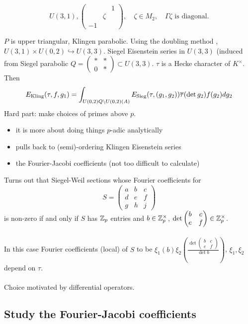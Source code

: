 \documentclass[12pt,amsfont]{amsart}
\begin{document}
\[U(3,1), \begin{pmatrix} & & 1 \\ & \zeta & \\ -1 & & \end{pmatrix}, \quad \zeta \in M_2, \quad \Gamma \zeta \text{ is diagonal.} \]

$P$ is upper triangular, Klingen parabolic. Using the doubling method , $U(3,1) \times U(0,2) \hookrightarrow U(3,3)$. Siegel Eisenstein series in $U(3,3)$ (induced from Siegel parabolic $Q = \begin{pmatrix} \ast & \ast \\ 0 & \ast \end{pmatrix} \subset U(3,3)$. $\tau$ is a Hecke character of $K^\times$. Then
\[E_{\text{Kling}}(\tau, f, g_1) = \int_{U(0,2)Q \setminus U(0,2)(A)} E_{\text{Sieg}}(\tau, (g_1, g_2)) \overline{\tau}(\det g_2) f(g_2) dg_2\]
Hard part: make choices of primes above $p$. 
\begin{itemize}
\item
it is more about doing things $p$-adic analytically
\item
pulls back to (semi)-ordering Klingen Eisenstein series 
\item
the Fourier-Jacobi coefficients (not too difficult to calculate)
\end{itemize}

Turns out that Siegel-Weil sections whose Fourier coefficients for 
\[S = \begin{pmatrix} a & b & c \\ d & e & f \\ g & h & j \end{pmatrix}\]
is non-zero if and only if $S$ has ${\mathbb Z}_p$ entries and $b \in {\mathbb Z}_p^\times$, $\det \left(\begin{matrix} b & c \\ e & f \end{matrix}\right) \in {\mathbb Z}_p^\times$. \\ \\
In this case Fourier coefficients (local) of $S$ to be $\xi_1(b) \xi_2\left(\frac{\det \begin{pmatrix} b & c \\ e & f \end{pmatrix}}{\det b} \right)$, $\xi_1, \xi_2$ depend on $\tau$. \\ \\
Choice motivated by differential operators. 

\subsection{Study the Fourier-Jacobi coefficients}
{\ }
\end{document}
